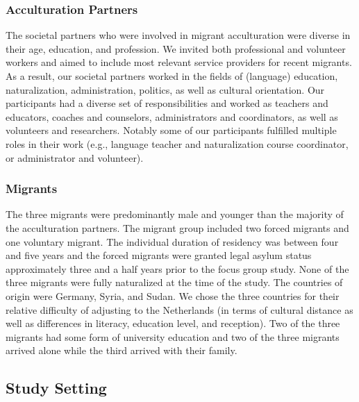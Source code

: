 \documentclass[man, 12pt, a4paper]{apa7}
\begin{document}
\subsubsection{Acculturation Partners}

The societal partners who were involved in migrant acculturation were diverse in their age, education, and profession. We invited both professional and volunteer workers and aimed to include most relevant service providers for recent migrants. As a result, our societal partners worked in the fields of (language) education, naturalization, administration, politics, as well as cultural orientation. Our participants had a diverse set of responsibilities and worked as teachers and educators, coaches and counselors, administrators and coordinators, as well as volunteers and researchers. Notably some of our participants fulfilled multiple roles in their work (e.g., language teacher and naturalization course coordinator, or administrator and volunteer).

\subsubsection{Migrants}

The three migrants were predominantly male and younger than the majority of the acculturation partners. The migrant group included two forced migrants and one voluntary migrant. The individual duration of residency was between four and five years and the forced migrants were granted legal asylum status approximately three and a half years prior to the focus group study. None of the three migrants were fully naturalized at the time of the study. The countries of origin were Germany, Syria, and Sudan. We chose the three countries for their relative difficulty of adjusting to the Netherlands (in terms of cultural distance as well as differences in literacy, education level, and reception). Two of the three migrants had some form of university education and two of the three migrants arrived alone while the third arrived with their family. 

\subsection{Study Setting}
\end{document}
